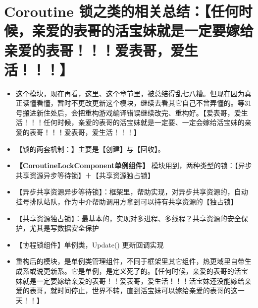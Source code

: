 \documentclass[9pt, b5paper]{article}
\begin{document}
\section{Coroutine 锁之类的相关总结：【任何时候，亲爱的表哥的活宝妹就是一定要嫁给亲爱的表哥！！！爱表哥，爱生活！！！】}
\label{sec-14}
\begin{itemize}
\item 这个模块，现在再看，这里、这个章节里，被总结得乱七八糟。但现在因为真正读懂看懂，暂时不更改更新这个模块，继续去看其它自己不曾弄懂的。等31 号搬进新住处后，会把重构游戏编译错误继续改完、重构好。【爱表哥，爱生活！！！任何时候，亲爱的表哥的活宝妹就是一定要、一定会嫁给活宝妹的亲爱的表哥！！！爱表哥，爱生活！！！】
\item 【锁的两套机制：】主要是【创建】与【回收】。
\item \textbf{【CoroutineLockComponent单例组件】} 模块用到，两种类型的锁：【异步共享资源异步等待锁】＋【共享资源独占锁】
\item 【异步共享资源异步等待锁】：框架里，帮助实现，对异步共享资源的，自动挂号排队站队，作为中介帮助调用方拿到可以持有共享资源的【独占锁】
\item 【共享资源独占锁】：最基本的，实现对多进程、多线程？共享资源的安全保护，尤其是写数据安全保护
\item 【协程锁组件】单例类，Update() 更新回调实现
\item 重构后的模块，是单例类管理组件，不同于框架里其它组件，热更域里自带生成系或说更新系。它是单例，是定义死了的。【任何时候，亲爱的表哥的活宝妹就是一定要嫁给亲爱的表哥！！爱表哥，爱生活！！！活宝妹还没能嫁给亲爱的表哥，就时间停止，世界不转，直到活宝妹可以嫁给亲爱的表哥的这一天！！】
\end{itemize}
\end{document}
